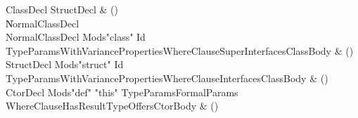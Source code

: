 \begin{bbgrammar}
 ClassDecl  \label{prod:ClassDecl}  \: StructDecl & ()\\
    \| NormalClassDecl\\
 NormalClassDecl  \label{prod:NormalClassDecl}  \: Mods\opt \xcd"class" Id TypeParamsWithVariance\opt Properties\opt WhereClause\opt Super\opt Interfaces\opt ClassBody & ()\\
 StructDecl  \label{prod:StructDecl}  \: Mods\opt \xcd"struct" Id TypeParamsWithVariance\opt Properties\opt WhereClause\opt Interfaces\opt ClassBody & ()\\
 CtorDecl  \label{prod:CtorDecl}  \: Mods\opt \xcd"def" \xcd"this" TypeParams\opt FormalParams WhereClause\opt HasResultType\opt Offers\opt CtorBody & ()\\
\end{bbgrammar}

